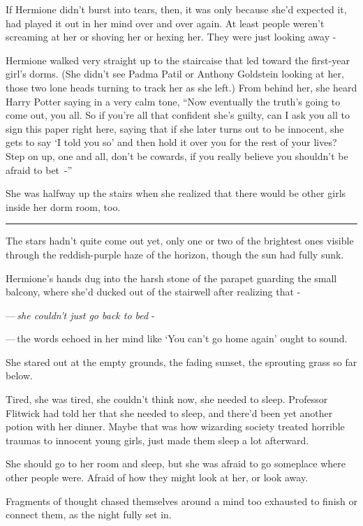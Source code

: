 If Hermione didn't burst into tears, then, it was only because she'd expected it, had played it out in her mind over and over again. At least people weren't screaming at her or shoving her or hexing her. They were just looking away -

Hermione walked very straight up to the staircaise that led toward the first-year girl's dorms. (She didn't see Padma Patil or Anthony Goldstein looking at her, those two lone heads turning to track her as she left.) From behind her, she heard Harry Potter saying in a very calm tone, ``Now eventually the truth's going to come out, you all. So if you're all that confident she's guilty, can I ask you all to sign this paper right here, saying that if she later turns out to be innocent, she gets to say `I told you so' and then hold it over you for the rest of your lives? Step on up, one and all, don't be cowards, if you really believe you shouldn't be afraid to bet~-''

She was halfway up the stairs when she realized that there would be other girls inside her dorm room, too.

\begin{center}\rule{3in}{0.4pt}\end{center}

The stars hadn't quite come out yet, only one or two of the brightest ones visible through the reddish-purple haze of the horizon, though the sun had fully sunk.

Hermione's hands dug into the harsh stone of the parapet guarding the small balcony, where she'd ducked out of the stairwell after realizing that -

---\,\emph{she couldn't just go back to bed} -

---\,the words echoed in her mind like `You can't go home again' ought to sound.

She stared out at the empty grounds, the fading sunset, the sprouting grass so far below.

Tired, she was tired, she couldn't think now, she needed to sleep. Professor Flitwick had told her that she needed to sleep, and there'd been yet another potion with her dinner. Maybe that was how wizarding society treated horrible traumas to innocent young girls, just made them sleep a lot afterward.

She should go to her room and sleep, but she was afraid to go someplace where other people were. Afraid of how they might look at her, or look away.

Fragments of thought chased themselves around a mind too exhausted to finish or connect them, as the night fully set in.

